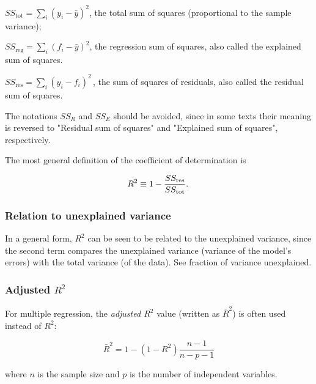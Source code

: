     $SS_\text{tot}=\sum_i (y_i-\bar{y})^2$, the total sum of squares (proportional to the sample variance);

    $SS_\text{reg}=\sum_i (f_i -\bar{y})^2$, the regression sum of squares, also called the explained sum of squares.

    $SS_\text{res}=\sum_i (y_i - f_i)^2\,$, the sum of squares of residuals, also called the residual sum of squares.

The notations $SS_{R}$ and $SS_{E}$ should be avoided, since in some texts their meaning is reversed to "Residual sum of squares" and "Explained sum of squares", respectively.

The most general definition of the coefficient of determination is

\begin{equation}
  R^2 \equiv 1 - {SS_{\rm res}\over SS_{\rm tot}}.\,
\end{equation}

\subsubsection{Relation to unexplained variance}

In a general form, $R^2$ can be seen to be related to the unexplained variance, since the second term compares the unexplained variance (variance of the model's errors) with the total variance (of the data). See fraction of variance unexplained.

\subsubsection{Adjusted $R^2$}

For multiple regression, the \emph{adjusted $R^2$} value (written as $\bar{R}^2$) is often used instead of $R^2$:

\begin{equation}\label{eq:adjustedR2}
      \bar{R}^2 = 1 - (1 - R^2)\frac{n - 1}{n - p - 1}
\end{equation}

where $n$ is the sample size and $p$ is the number of independent variables.

